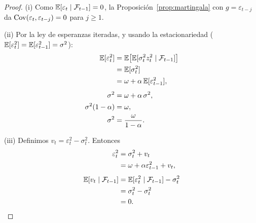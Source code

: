 \begin{proof}
(i) Como $\mathbb{E}[\varepsilon_t\mid\mathcal F_{t-1}]=0$, la Proposición~\ref{prop:martingala} con $g=\varepsilon_{t-j}$
da $\operatorname{Cov}(\varepsilon_t,\varepsilon_{t-j})=0$ para $j\ge1$.

(ii) Por la ley de esperanzas iteradas, y usando la estacionariedad ($\mathbb{E}[\varepsilon_t^2]=\mathbb{E}[\varepsilon_{t-1}^2]=\sigma^2$):
\begin{align*}
  \mathbb{E}[\varepsilon_t^2] &= \mathbb{E}\bigl[\mathbb{E}[\sigma_t^2z_t^2\mid\mathcal F_{t-1}]\bigr]\\
                      &= \mathbb{E}[\sigma_t^2]\\
                      &= \omega+\alpha\,\mathbb{E}[\varepsilon_{t-1}^2],\\[4pt]
  \sigma^2            &= \omega+\alpha\,\sigma^2,\\
  \sigma^2(1-\alpha)  &= \omega,\\
  \sigma^2            &= \frac{\omega}{1-\alpha}.
\end{align*}

(iii) Definimos $v_t=\varepsilon_t^2-\sigma_t^2$. Entonces
\begin{align*}
  \varepsilon_t^2 &= \sigma_t^2+v_t\\
                  &= \omega+\alpha\varepsilon_{t-1}^2+v_t,\\[4pt]
  \mathbb{E}[v_t\mid\mathcal F_{t-1}] &= \mathbb{E}[\varepsilon_t^2\mid\mathcal F_{t-1}]-\sigma_t^2\\
                              &= \sigma_t^2-\sigma_t^2\\
                              &= 0 .
\end{align*}


\end{proof}
